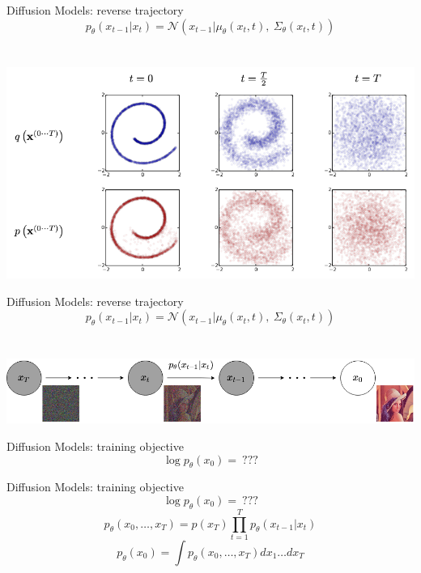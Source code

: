 \documentclass{beamer}
\begin{document}
\begin{frame}[t]{Diffusion Models: reverse trajectory \cite{sohldickstein2015deep}}
    $$ p_\theta(x_{t-1}|x_t) = \mathcal{N}(x_{t-1} | \mu_\theta(x_t, t),\ \Sigma_\theta(x_t, t)) $$ \\~\\
    \includegraphics[width=\textwidth]{../images/2022-03-17-diffusion_models_files/swiss_roll_denoising.png}
\end{frame}

\begin{frame}[t]{Diffusion Models: reverse trajectory \cite{sohldickstein2015deep}}
    $$ p_\theta(x_{t-1}|x_t) = \mathcal{N}(x_{t-1} | \mu_\theta(x_t, t),\ \Sigma_\theta(x_t, t)) $$ \\~\\
    \includegraphics[width=\textwidth]{../images/2022-03-17-diffusion_models_files/denoising.png}
\end{frame}

\begin{frame}[t]{Diffusion Models: training objective \cite{sohldickstein2015deep}}
    $$ \log p_\theta(x_0) =\ ??? $$
\end{frame}

\begin{frame}[t]{Diffusion Models: training objective \cite{sohldickstein2015deep}}
    $$ \log p_\theta(x_0) =\ ??? $$
    $$ p_\theta(x_0, \dots, x_T) = p(x_T) \prod_{t=1}^T p_\theta(x_{t-1}|x_t) $$
    $$ p_\theta(x_0) = \int p_\theta(x_0, \dots, x_T) dx_1 \dots dx_T $$
\end{frame}
\end{document}
